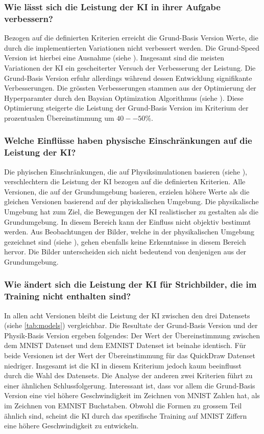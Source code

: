 \subsubsection*{Wie lässt sich die Leistung der KI in ihrer Aufgabe verbessern?}\label{subsub:d_frage_unter_3} 
Bezogen auf die definierten Kriterien erreicht die Grund-Basis Version Werte,
die durch die implementierten Variationen nicht verbessert werden. Die
Grund-Speed Version ist hierbei eine Ausnahme (siehe ).
Insgesamt sind die meisten Variationen der KI ein gescheiterter Versuch der
Verbesserung der Leistung. Die Grund-Basis Version erfuhr allerdings während
dessen Entwicklung signifikante Verbesserungen. Die grössten Verbesserungen
stammen aus der Optimierung der Hyperparamter durch den Baysian Optimization
Algorithmus (siehe ). Diese Optimierung steigerte
die Leistung der Grund-Basis Version im Kriterium der prozentualen
Übereinstimmung um $40--50\%$.

\subsubsection*{Welche Einflüsse haben physische Einschränkungen auf die
Leistung der KI?}\label{subsub:d_frage_unter_4} Die phyischen Einschränkungen,
die auf Physiksimulationen basieren (siehe ),
verschlechtern die Leistung der KI bezogen auf die definierten Kriterien. Alle
Versionen, die auf der Grundumgebung basieren, erzielen höhere Werte als die
gleichen Versionen basierend auf der phyiskalischen Umgebung. Die physikalische
Umgebung hat zum Ziel, die Bewegungen der KI realistischer zu gestalten als die
Grundumgebung. In diesem Bereich kann der Einfluss nicht objektiv bestimmt
werden. Aus Beobachtungen der Bilder, welche in der physikalischen Umgebung
gezeichnet sind (siehe ), gehen ebenfalls keine
Erkenntnisse in diesem Bereich hervor. Die Bilder unterscheiden sich nicht
bedeutend von denjenigen aus der Grundumgebung.

\subsubsection*{Wie ändert sich die Leistung der KI für Strichbilder, die im Training nicht enthalten sind?}\label{subsub:d_frage_unter_5} 
In allen acht Versionen bleibt die Leistung der KI zwischen den drei Datensets
(siehe \autoref{tab:models}) vergleichbar. Die Resultate der Grund-Basis Version
und der Physik-Basis Version ergeben folgendes: Der Wert der Übereinstimmung
zwischen dem MNIST Datenset und dem EMNIST Datenset ist beinahe identisch. Für
beide Versionen ist der Wert der Übereinstimmung für das QuickDraw Datenset
niedriger. Insgesamt ist die KI in diesem Kriterium jedoch kaum beeinflusst
durch die Wahl des Datensets. Die Analyse der anderen zwei Kriterien führt zu
einer ähnlichen Schlussfolgerung. Interessant ist, dass vor allem die
Grund-Basis Version eine viel höhere Geschwindigkeit im Zeichnen von MNIST
Zahlen hat, als im Zeichnen von EMNIST Buchstaben. Obwohl die Formen zu grossem
Teil ähnlich sind, scheint die KI durch das spezifische Training auf MNIST
Ziffern eine höhere Geschwindigkeit zu entwickeln.

